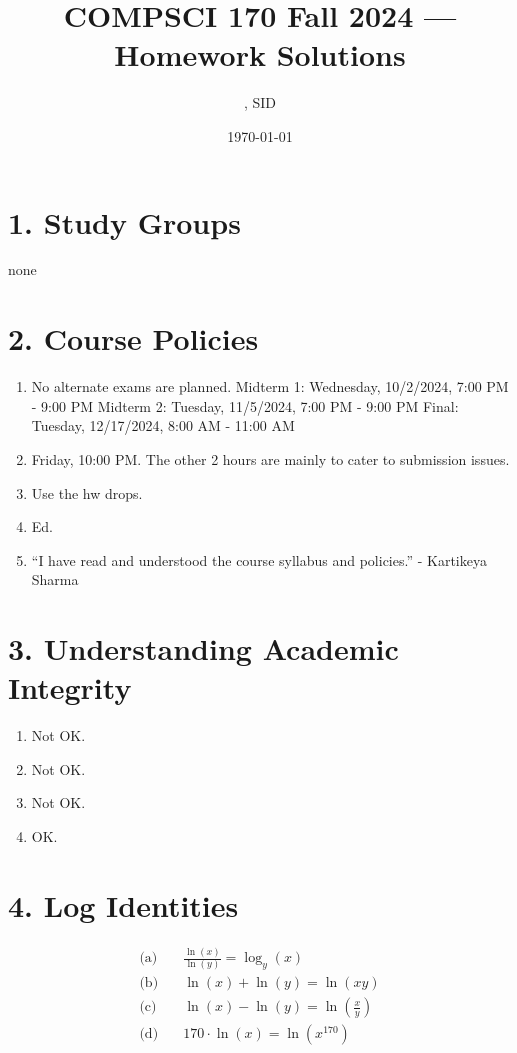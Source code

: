 \documentclass[11pt]{article}
\title{COMPSCI 170 Fall 2024 --- Homework \Homework Solutions}
\author{\Name, SID \SID}
\date{\today}
\newenvironment{qparts}{\begin{enumerate}[{(}a{)}]}{\end{enumerate}}
\begin{document}
\maketitle

\section*{1. Study Groups}

none



\newpage
\section*{2. Course Policies}
\begin{qparts}
\item
No alternate exams are planned. \newline
Midterm 1: Wednesday, 10/2/2024, 7:00 PM - 9:00 PM \newline
Midterm 2: Tuesday, 11/5/2024, 7:00 PM - 9:00 PM \newline
Final: Tuesday, 12/17/2024, 8:00 AM - 11:00 AM

\item
Friday, 10:00 PM. The other 2 hours are mainly to cater to submission issues.

\item
Use the hw drops.

\item
Ed.

\item
“I have read and understood the course syllabus and policies.” - Kartikeya Sharma

\end{qparts}


\newpage
\section*{3. Understanding Academic Integrity}
\begin{qparts}
\item
Not OK.

\item
Not OK.

\item
Not OK.

\item
OK.

\end{qparts}


\newpage
\section*{4. Log Identities}
\begin{align*}
\text{(a)} & \quad \frac{\ln(x)}{\ln(y)} = \log_y(x) \\
\text{(b)} & \quad \ln(x) + \ln(y) = \ln(xy) \\
\text{(c)} & \quad \ln(x) - \ln(y) = \ln\left(\frac{x}{y}\right) \\
\text{(d)} & \quad 170 \cdot \ln(x) = \ln(x^{170})
\end{align*}
\end{document}
